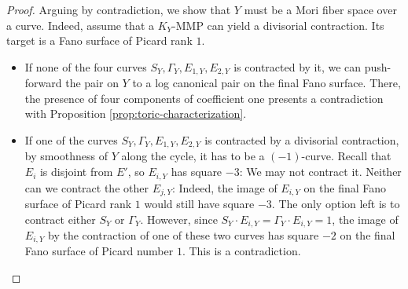 \documentclass{amsart}
\theoremstyle{definition}
\theoremstyle{remark}
\numberwithin{equation}{section}
\begin{document}
\begin{proof}
Arguing by contradiction, we show that $Y$ must be a Mori fiber space over a curve. Indeed, assume that a $K_Y$-MMP can yield a divisorial contraction. Its target is a Fano surface of Picard rank $1$.
\begin{itemize}
    \item If none of the four curves $S_Y,\Gamma_Y,E_{1,Y},E_{2,Y}$ is contracted by it, we can push-forward the pair on $Y$ to a log canonical pair on the final Fano surface. There, the presence of four components of coefficient one presents a contradiction with Proposition \ref{prop:toric-characterization}.
\item If one of the curves $S_Y,\Gamma_Y, E_{1,Y},E_{2,Y}$ is contracted by a divisorial contraction, by smoothness of $Y$ along the cycle, it has to be a $(-1)$-curve. Recall that $E_i$ is disjoint from $E'$, so $E_{i,Y}$ has square $-3$: We may not contract it. Neither can we contract the other $E_{j,Y}$: Indeed, the image of $E_{i,Y}$ on the final Fano surface of Picard rank $1$ would still have square $-3$. The only option left is to contract either $S_Y$ or $\Gamma_Y$. However, since $S_Y\cdot E_{i,Y} = \Gamma_Y\cdot E_{i,Y} = 1$, the image of $E_{i,Y}$ by the contraction of one of these two curves has square $-2$ on the final Fano surface of Picard number $1$. This is a contradiction.
\end{itemize}


\end{proof}
\end{document}
